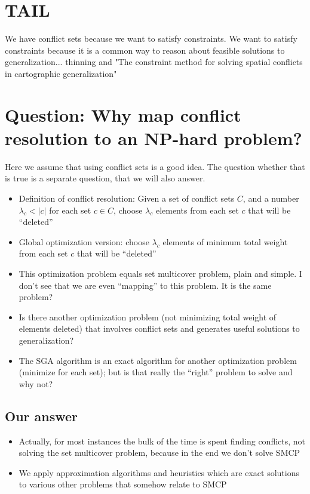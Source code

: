 \documentclass[11pt, oneside]{article}   	%
\begin{document}
\section{TAIL}

We have conflict sets because we want to satisfy constraints. We want to satisfy constraints because it is a common way to reason about feasible solutions to generalization... thinning and "The constraint method for solving spatial conflicts in cartographic generalization"


\section{Question: Why map conflict resolution to an NP-hard problem?}
Here we assume that using conflict sets is a good idea. The question whether that is true is a separate question, that we will also answer.
\begin{itemize}
\item Definition of conflict resolution: Given a set of conflict sets $C$, and a number $\lambda_c < \left\vert c \right\vert$ for each set $c \in C$, choose $\lambda_c$ elements from each set $c$ that will be ``deleted'' 
\item Global optimization version: choose $\lambda_c$ elements of minimum total weight from each set $c$ that will be ``deleted'' 
\item This optimization problem equals set multicover problem, plain and simple. I don't see that we are even ``mapping'' to this problem. It is the same problem?
\item Is there another optimization problem (not minimizing total weight of elements deleted) that involves conflict sets and generates useful solutions to generalization?
\item The SGA algorithm is an exact algorithm for another optimization problem (minimize for each set); but is that really the ``right'' problem to solve and why not?
\end{itemize}

\subsection{Our answer}

\begin{itemize}
\item Actually, for most instances the bulk of the time is spent finding conflicts, not solving the set multicover problem, because in the end we don't solve SMCP
\item We apply approximation algorithms and heuristics which are exact solutions to various other problems that somehow relate to SMCP
\end{itemize}
\end{document}

